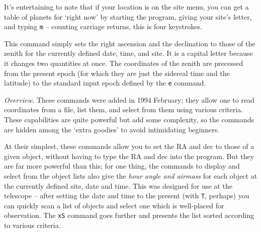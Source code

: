 It's entertaining to note that if your location is on the site
menu, you can get a table of planets for `right now' by starting the
program, giving your site's letter, and typing {\tt m} -- counting
carriage returns, this is four keystrokes.


This command simply sets the right ascension and the declination to
those of the zenith for the currently defined
date, time, and site.  It is a capital letter because it changes
two quantities at once.  The coordinates of the zenith are 
precessed from the present epoch (for which they are just the 
sidereal time and the latitude) to the standard input epoch 
defined by the {\tt e} command.


{\it Overview.} These commands were added in 1994 February; they allow one to
read coordinates from a file, list them, and select from them
using various criteria.  These capabilities are quite powerful
but add some complexity, so the commands are hidden among the `extra goodies' 
to avoid intimidating beginners.

At their simplest, these commands allow you to set
the RA and dec to those of a given object, without having to type the
RA and dec into the program.  But they are far more powerful than this;
for one thing, the commands to display and select from the object 
lists also give the {\it hour angle and airmass} for each object 
at the currently defined site, date and time.   This was designed for use 
at the telescope -- after setting the date and time to the present 
(with {\tt T}, perhaps) you can quickly scan a list of objects and 
select one which is well-placed for observation.   The {\tt xS} command 
goes further and presents the list sorted according to various criteria.  

